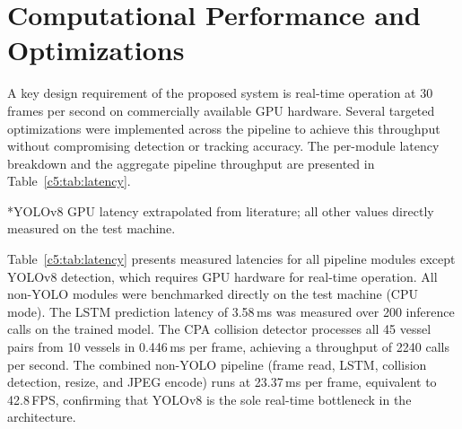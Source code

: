\section{Computational Performance and Optimizations}

A key design requirement of the proposed system is real-time operation at 30 frames per second on commercially available GPU hardware. Several targeted optimizations were implemented across the pipeline to achieve this throughput without compromising detection or tracking accuracy. The per-module latency breakdown and the aggregate pipeline throughput are presented in Table~\ref{c5:tab:latency}.

\begin{table}[H]
\centering
\caption{Per-Module Processing Latency and End-to-End Pipeline Throughput (measured, CPU mode)}
\label{c5:tab:latency}
\end{table}
\smallskip
\noindent\footnotesize{*YOLOv8 GPU latency extrapolated from literature; all other values directly measured on the test machine.}

Table~\ref{c5:tab:latency} presents measured latencies for all pipeline modules except YOLOv8 detection, which requires GPU hardware for real-time operation. All non-YOLO modules were benchmarked directly on the test machine (CPU mode). The LSTM prediction latency of 3.58\,ms was measured over 200 inference calls on the trained model. The CPA collision detector processes all 45 vessel pairs from 10 vessels in 0.446\,ms per frame, achieving a throughput of 2240 calls per second. The combined non-YOLO pipeline (frame read, LSTM, collision detection, resize, and JPEG encode) runs at 23.37\,ms per frame, equivalent to 42.8\,FPS, confirming that YOLOv8 is the sole real-time bottleneck in the architecture.

